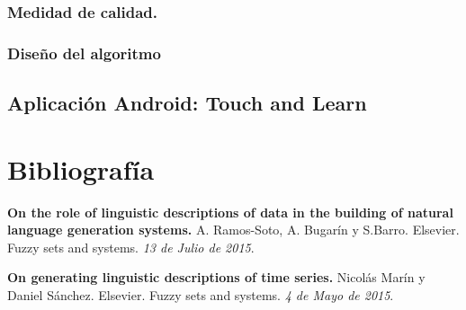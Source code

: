 \documentclass[10pt,a4paper]{article}
\begin{document}
\subsubsection{Medidad de calidad.}

\subsubsection{Diseño del algoritmo}

\subsection{Aplicación Android: Touch and Learn}
\newpage

\section{Bibliografía}
\begin{enumerate}[{[}1{]}]
\item \textbf{On the role of linguistic descriptions of data in the building of natural language generation systems.} A. Ramos-Soto, A. Bugarín y S.Barro. Elsevier. Fuzzy sets and systems. \textit{13 de Julio de 2015}.
\item \textbf{On generating linguistic descriptions of time series.} Nicolás Marín y Daniel Sánchez. Elsevier. Fuzzy sets and systems. \textit{4 de Mayo de 2015}.
\end{enumerate}
\end{document}
